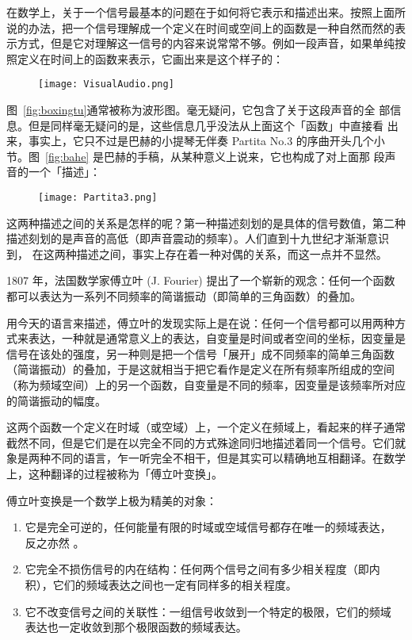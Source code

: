 在数学上，关于一个信号最基本的问题在于如何将它表示和描述出来。按照上面所
说的办法，把一个信号理解成一个定义在时间或空间上的函数是一种自然而然的表
示方式，但是它对理解这一信号的内容来说常常不够。例如一段声音，如果单纯按
照定义在时间上的函数来表示，它画出来是这个样子的：

\begin{figure}[htbp]
  \centering
  \texttt{[image: VisualAudio.png]}
\end{figure}

图~\ref{fig:boxingtu}通常被称为波形图。毫无疑问，它包含了关于这段声音的全
部信息。但是同样毫无疑问的是，这些信息几乎没法从上面这个「函数」中直接看
出来，事实上，它只不过是巴赫的小提琴无伴奏 Partita No.3 的序曲开头几个小
节。图~\ref{fig:bahe} 是巴赫的手稿，从某种意义上说来，它也构成了对上面那
段声音的一个「描述」：

\begin{figure}[htbp]
  \centering
  \texttt{[image: Partita3.png]}
\end{figure}

这两种描述之间的关系是怎样的呢？第一种描述刻划的是具体的信号数值，第二种
描述刻划的是声音的高低（即声音震动的频率）。人们直到十九世纪才渐渐意识到，
在这两种描述之间，事实上存在着一种对偶的关系，而这一点并不显然。

1807 年，法国数学家傅立叶 (J. Fourier) 提出了一个崭新的观念：任何一个函数
都可以表达为一系列不同频率的简谐振动（即简单的三角函数）的叠加。

用今天的语言来描述，傅立叶的发现实际上是在说：任何一个信号都可以用两种方
式来表达，一种就是通常意义上的表达，自变量是时间或者空间的坐标，因变量是
信号在该处的强度，另一种则是把一个信号「展开」成不同频率的简单三角函数
（简谐振动）的叠加，于是这就相当于把它看作是定义在所有频率所组成的空间
（称为频域空间）上的另一个函数，自变量是不同的频率，因变量是该频率所对应
的简谐振动的幅度。


这两个函数一个定义在时域（或空域）上，一个定义在频域上，看起来的样子通常
截然不同，但是它们是在以完全不同的方式殊途同归地描述着同一个信号。它们就
象是两种不同的语言，乍一听完全不相干，但是其实可以精确地互相翻译。在数学
上，这种翻译的过程被称为「傅立叶变换」。

傅立叶变换是一个数学上极为精美的对象：
\begin{enumerate}
\item 它是完全可逆的，任何能量有限的时域或空域信号都存在唯一的频域表达，
  反之亦然 。
\item 它完全不损伤信号的内在结构：任何两个信号之间有多少相关程度（即内
  积），它们的频域表达之间也一定有同样多的相关程度。
\item 它不改变信号之间的关联性：一组信号收敛到一个特定的极限，它们的频域
  表达也一定收敛到那个极限函数的频域表达。
\end{enumerate}

